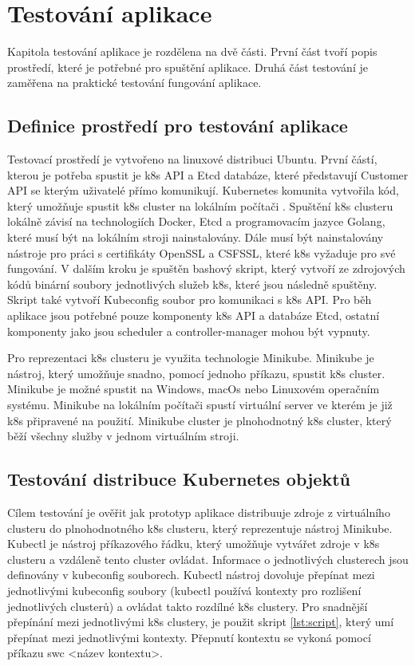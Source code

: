 \chapter{Testování aplikace}
Kapitola testování aplikace je rozdělena na dvě části. První část tvoří popis prostředí, které je potřebné pro spuštění aplikace. Druhá část testování je zaměřena na praktické testování fungování aplikace. 
\section{Definice prostředí pro testování aplikace}
Testovací prostředí je vytvořeno na linuxové distribuci Ubuntu. První částí, kterou je potřeba spustit je k8s API a Etcd databáze, které představují Customer API se kterým uživatelé přímo komunikují. Kubernetes komunita vytvořila kód, který umožňuje \linebreak spustit k8s cluster na lokálním počítači \cite{local-cluster}. Spuštění k8s clusteru lokálně závisí na technologiích Docker, Etcd a programovacím jazyce Golang, které musí být na lokálním stroji nainstalovány. Dále musí být nainstalovány nástroje pro práci s certifikáty OpenSSL a CSFSSL, které k8s vyžaduje pro své fungování. V dalším kroku je spuštěn bashový skript, který vytvoří ze zdrojových kódů binární soubory jednotlivých služeb k8s, které jsou následně spuštěny. Skript také vytvoří Kubeconfig soubor pro komunikaci s k8s API. Pro běh aplikace jsou potřebné pouze komponenty k8s API a databáze Etcd, ostatní komponenty jako jsou scheduler a controller-manager mohou být vypnuty.\par 
    Pro reprezentaci k8s clusteru je využita technologie Minikube. Minikube je nástroj, který umožňuje snadno, pomocí jednoho příkazu, spustit k8s cluster. Minikube je možné spustit na Windows, macOs nebo Linuxovém operačním systému. Minikube na lokálním počítači spustí virtuální server ve kterém je již k8s připravené na použití. Minikube cluster je plnohodnotný k8s cluster, který běží všechny služby v jednom virtuálním stroji. \par
\section{Testování distribuce Kubernetes objektů}
    Cílem testování je ověřit jak prototyp aplikace distribuuje zdroje z virtuálního clusteru do plnohodnotného k8s clusteru, který reprezentuje nástroj Minikube. Kubectl je nástroj příkazového řádku, který umožňuje vytvářet zdroje v k8s clusteru a vzdáleně tento cluster ovládat. Informace o jednotlivých clusterech jsou definovány v kubeconfig souborech. Kubectl nástroj dovoluje přepínat mezi jednotlivými kubeconfig soubory (kubectl používá kontexty pro rozlišení jednotlivých clusterů) a ovládat takto rozdílné k8s clustery. Pro snadnější přepínání mezi jednotlivými k8s clustery, je použit skript \ref{lst:script}, který umí přepínat mezi jednotlivými kontexty. Přepnutí kontextu se vykoná pomocí příkazu swc <název kontextu>.  
    
